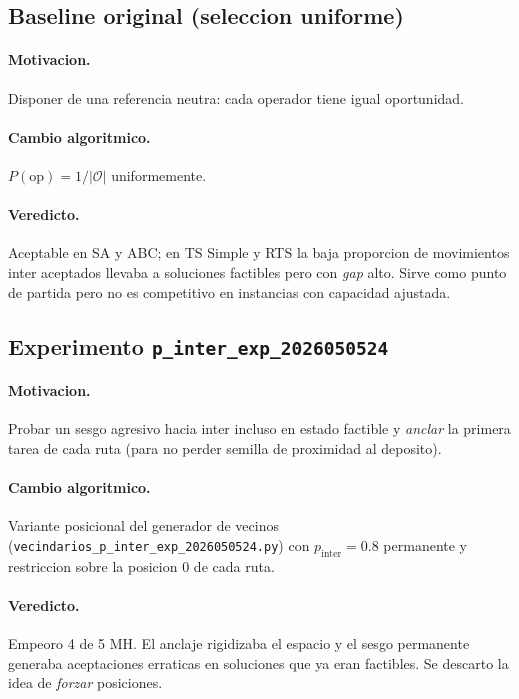\documentclass[11pt,a4paper]{article}
\newcommand{\mh}{MH}
\newcommand{\code}[1]{\texttt{#1}}
\begin{document}
\subsection{Baseline original (seleccion uniforme)}

\paragraph{Motivacion.} Disponer de una referencia neutra: cada
operador tiene igual oportunidad.

\paragraph{Cambio algoritmico.}
$P(\text{op})=1/|\mathcal{O}|$ uniformemente.

\paragraph{Veredicto.} Aceptable en SA y ABC; en TS Simple y RTS
la baja proporcion de movimientos inter aceptados llevaba a soluciones
factibles pero con \emph{gap} alto. Sirve como punto de partida pero
no es competitivo en instancias con capacidad ajustada.

\subsection{Experimento \texttt{p\_inter\_exp\_2026050524}}

\paragraph{Motivacion.} Probar un sesgo agresivo hacia inter
incluso en estado factible y \emph{anclar} la primera tarea de cada
ruta (para no perder semilla de proximidad al deposito).

\paragraph{Cambio algoritmico.} Variante posicional del generador de
vecinos (\code{vecindarios\_p\_inter\_exp\_2026050524.py}) con
$p_{\text{inter}}=0.8$ permanente y restriccion sobre la posicion $0$
de cada ruta.

\paragraph{Veredicto.} Empeoro 4 de 5 \mh{}. El anclaje rigidizaba el
espacio y el sesgo permanente generaba aceptaciones erraticas en
soluciones que ya eran factibles. Se descarto la idea de \emph{forzar}
posiciones.
\end{document}

